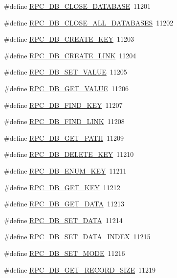 \begin{DoxyCompactItemize}
\#define \hyperlink{group__mrpcdefineh_ga085261b8782a013825aeadb0838a5bfb}{RPC\_\-DB\_\-CLOSE\_\-DATABASE}~11201
\item 
\#define \hyperlink{group__mrpcdefineh_ga677c4b59869a9d9f143a494798a8d9cb}{RPC\_\-DB\_\-CLOSE\_\-ALL\_\-DATABASES}~11202
\item 
\#define \hyperlink{group__mrpcdefineh_gafcf9aa4b3da3f9be05de7fb40ab36cd2}{RPC\_\-DB\_\-CREATE\_\-KEY}~11203
\item 
\#define \hyperlink{group__mrpcdefineh_ga1685e0fb21760febac20d116b93708dd}{RPC\_\-DB\_\-CREATE\_\-LINK}~11204
\item 
\#define \hyperlink{group__mrpcdefineh_ga4ecc165164d5365cc130d75fa918f332}{RPC\_\-DB\_\-SET\_\-VALUE}~11205
\item 
\#define \hyperlink{group__mrpcdefineh_gaba365bffc385185187ea7b4f1b25c8b2}{RPC\_\-DB\_\-GET\_\-VALUE}~11206
\item 
\#define \hyperlink{group__mrpcdefineh_gaee0b72994ce1f576cf459bc726901ce5}{RPC\_\-DB\_\-FIND\_\-KEY}~11207
\item 
\#define \hyperlink{group__mrpcdefineh_ga825f105bd510d8624a418ee85b0d0df9}{RPC\_\-DB\_\-FIND\_\-LINK}~11208
\item 
\#define \hyperlink{group__mrpcdefineh_gadc10af16548bbb48efe1ca5317f8b330}{RPC\_\-DB\_\-GET\_\-PATH}~11209
\item 
\#define \hyperlink{group__mrpcdefineh_ga235ee6e8653969860ed3128c9998d1a3}{RPC\_\-DB\_\-DELETE\_\-KEY}~11210
\item 
\#define \hyperlink{group__mrpcdefineh_ga35ab40580e5431cd16905ca0cc15cbe7}{RPC\_\-DB\_\-ENUM\_\-KEY}~11211
\item 
\#define \hyperlink{group__mrpcdefineh_ga87d034e95f02df59e78f7a1b40101ba9}{RPC\_\-DB\_\-GET\_\-KEY}~11212
\item 
\#define \hyperlink{group__mrpcdefineh_ga730e088a2e3838d04d5f4aa55466f2e3}{RPC\_\-DB\_\-GET\_\-DATA}~11213
\item 
\#define \hyperlink{group__mrpcdefineh_ga8a9ca4be59df7624dd39380b21cbbb88}{RPC\_\-DB\_\-SET\_\-DATA}~11214
\item 
\#define \hyperlink{group__mrpcdefineh_ga071b7fc015474387c30d1fcc7193f486}{RPC\_\-DB\_\-SET\_\-DATA\_\-INDEX}~11215
\item 
\#define \hyperlink{group__mrpcdefineh_ga784c96e198a61dd19c2a73801093026c}{RPC\_\-DB\_\-SET\_\-MODE}~11216
\item 
\#define \hyperlink{group__mrpcdefineh_gae9e1a4f5fcb9ebf0dbed23e1bb297a31}{RPC\_\-DB\_\-GET\_\-RECORD\_\-SIZE}~11219

\end{DoxyCompactItemize}
